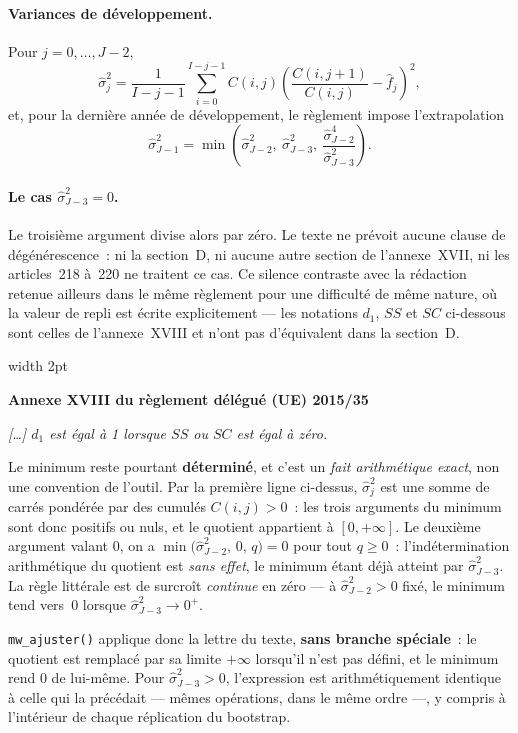 \documentclass[a4paper,11pt]{article}
\newcommand{\code}[1]{\texttt{\small #1}}
\newcommand{\reglement}[2]{%
  \par\vspace{2mm}\noindent\begin{minipage}{\linewidth}
  \small\setlength{\parindent}{0pt}
  \textcolor{financeblue}{\vrule width 2pt}\hspace{4mm}%
  \begin{minipage}{\dimexpr\linewidth-7mm\relax}
  \textcolor{financeblue}{\textbf{#1}}
  \par\vspace{2pt}
  {\itshape #2}
  \end{minipage}
  \end{minipage}\par\vspace{3mm}}
\begin{document}
\paragraph{Variances de développement.} Pour $j = 0,\dots,J-2$,
\[
  \hat\sigma_j^2 = \frac{1}{I-j-1}\sum_{i=0}^{I-j-1} C(i,j)
  \left(\frac{C(i,j+1)}{C(i,j)} - \hat f_j\right)^2,
\]
et, pour la dernière année de développement, le règlement impose l'extrapolation
\[
  \hat\sigma_{J-1}^2 = \min\!\left(\hat\sigma_{J-2}^2,\ \hat\sigma_{J-3}^2,\
  \frac{\hat\sigma_{J-2}^4}{\hat\sigma_{J-3}^2}\right).
\]

\paragraph{Le cas $\hat\sigma_{J-3}^2 = 0$.}
Le troisième argument divise alors par zéro. Le texte ne prévoit aucune clause
de dégénérescence~: ni la section~D, ni aucune autre section de l'annexe~XVII,
ni les articles~218 à~220 ne traitent ce cas. Ce silence contraste avec la
rédaction retenue ailleurs dans le même règlement pour une difficulté de même
nature, où la valeur de repli est écrite explicitement --- les notations $d_1$,
$SS$ et $SC$ ci-dessous sont celles de l'annexe~XVIII et n'ont pas d'équivalent
dans la section~D.

\reglement{Annexe XVIII du règlement délégué (UE) 2015/35}{[\dots] $d_1$ est
égal à 1 lorsque $SS$ ou $SC$ est égal à zéro.}

\noindent
Le minimum reste pourtant \textbf{déterminé}, et c'est un \emph{fait
arithmétique exact}, non une convention de l'outil. Par la première ligne
ci-dessus, $\hat\sigma_j^2$ est une somme de carrés pondérée par des cumulés
$C(i,j) > 0$~: les trois arguments du minimum sont donc positifs ou nuls, et le
quotient appartient à $[0,+\infty]$. Le deuxième argument valant $0$, on a
$\min\big(\hat\sigma_{J-2}^2,\,0,\,q\big) = 0$ pour tout $q \ge 0$~:
l'indétermination arithmétique du quotient est \emph{sans effet}, le minimum
étant déjà atteint par $\hat\sigma_{J-3}^2$. La règle littérale est de surcroît
\emph{continue} en zéro --- à $\hat\sigma_{J-2}^2 > 0$ fixé, le minimum tend
vers~$0$ lorsque $\hat\sigma_{J-3}^2 \to 0^+$.

\code{mw\_ajuster()} applique donc la lettre du texte, \textbf{sans branche
spéciale}~: le quotient est remplacé par sa limite $+\infty$ lorsqu'il n'est pas
défini, et le minimum rend $0$ de lui-même. Pour $\hat\sigma_{J-3}^2 > 0$,
l'expression est arithmétiquement identique à celle qui la précédait --- mêmes
opérations, dans le même ordre ---, y compris à l'intérieur de chaque
réplication du bootstrap.
\end{document}

